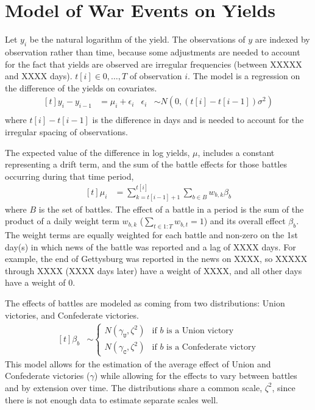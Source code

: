 \section{Model of War Events on Yields}
\label{bonds_battles:sec:model-war-events}

Let $y_{i}$ be the natural logarithm of the yield.
The observations of $y$ are indexed by observation rather than time, because some adjustments are needed to account for the fact that yields are observed are irregular frequencies (between XXXXX and XXXX days).
$t[i] \in 0, \dots, T$ of observation $i$.
The model is a regression on the difference of the yields on covariates.
\begin{equation}
  \label{bonds_battles:eq:1}
  \begin{aligned}[t]
    y_{i} - y_{i - 1} &= \mu_{i} + \epsilon_{i} & \epsilon_{i} & \sim N(0, (t[i] - t[i - 1]) \sigma^{2}) \\
  \end{aligned}
\end{equation}
where $t[i] - t[i - 1]$ is the difference in days and is needed to account for the irregular spacing of observations.

The expected value of the difference in log yields, $\mu$, includes a constant representing a drift term, and the sum of the battle effects for those battles occurring during that time period,
\begin{equation}
  \label{bonds_battles:eq:2}
  \begin{aligned}[t]
    \mu_{i} &= \sum_{k = t[i-1] + 1}^{t[i]} \sum_{b \in B} w_{b,k} \beta_{b}
  \end{aligned}
\end{equation}
where $B$ is the set of battles.
The effect of a battle in a period is the sum of the product of a daily weight term $w_{b,k}$ ($\sum_{t \in 1:T} w_{b,t} = 1$) and its overall effect $\beta_{b}$.
The weight terms are equally weighted for each battle and non-zero on the 1st day(s) in which news of the battle was reported and a lag of XXXX days.
For example, the end of Gettysburg was reported in the news on XXXX, so XXXXX through XXXX (XXXX days later) have a weight of XXXX, and all other days have a weight of 0.

The effects of battles are modeled as coming from two distributions: Union victories, and Confederate victories.
\begin{equation}
  \label{bonds_battles:eq:4}
  \begin{aligned}[t]
  \beta_{b} &\sim
  \begin{cases}
    N(\gamma_{\mathtt{U}}, \zeta^{2}) & \text{if $b$ is a Union victory} \\
    N(\gamma_{\mathtt{C}}, \zeta^{2}) & \text{if $b$ is a Confederate victory}
  \end{cases}
  \end{aligned}
\end{equation}
This model allows for the estimation of the average effect of Union and Confederate victories ($\gamma$) while allowing for the effects to vary between battles and by extension over time.
The distributions share a common scale, $\zeta^{2}$, since there is not enough data to estimate separate scales well.


